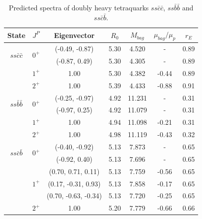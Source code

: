 \documentclass[prd,twocolumn,floatfix,nofootinbib]{revtex4}
\begin{document}
\renewcommand{\tabcolsep}{0.83cm}
\renewcommand{\arraystretch}{1.2}
\begin{table}[!htbp]
    \caption{Predicted spectra of doubly heavy tetraquarks $ss\bar{c}\bar{c}$, $ss\bar{b}\bar{b}$ and $ss\bar{c}\bar{b}$.}
    \label{tab:2heavytetraquark0}
    \begin{tabular}{ccccccc}
        \hline\hline
        {\rm State}     &$J^{P}$    &{\rm Eigenvector}      &$R_{0}$    &$M_{bag}$  &$\mu_{bag}/\mu_{p}$    &$r_{E}$ \\ \hline
        \multirow{2}{*}{$ss\bar{c}\bar{c}$}
                        &\multirow{2}{*}{$0^{+}$}
                                    &(-0.49, -0.87)         &5.30	    &4.520	    &-                      &0.89 \\ 
                        &           &(-0.87, 0.49)          &5.30	    &4.305	    &-                      &0.89 \\ 
                        &$1^{+}$    &1.00                   &5.30	    &4.382	    &-0.44                  &0.89 \\ 
                        &$2^{+}$    &1.00                   &5.39	    &4.433	    &-0.88                  &0.91 \\ 
        \multirow{2}{*}{$ss\bar{b}\bar{b}$}
                        &\multirow{2}{*}{$0^{+}$}
                                    &(-0.25, -0.97)         &4.92	    &11.231	    &-                      &0.31 \\ 
                        &           &(-0.97, 0.25)          &4.92	    &11.079	    &-                      &0.31 \\ 
                        &$1^{+}$    &1.00                   &4.94	    &11.098	    &-0.21                  &0.31 \\ 
                        &$2^{+}$    &1.00                   &4.98	    &11.119	    &-0.43                  &0.32 \\ 
        \multirow{2}{*}{$ss\bar{c}\bar{b}$}
                        &\multirow{2}{*}{$0^{+}$}
                                    &(-0.40, -0.92)         &5.13	    &7.873	    &-                      &0.65 \\ 
                        &           &(-0.92, 0.40)          &5.13	    &7.696	    &-                      &0.65 \\ 
                        &\multirow{3}{*}{$1^{+}$}
                                    &(0.70, 0.71, 0.11)     &5.13	    &7.759	    &-0.56                  &0.65 \\ 
                        &           &(0.17, -0.31, 0.93)    &5.13	    &7.858	    &-0.17                  &0.65 \\ 
                        &           &(0.70, -0.63, -0.34)   &5.13	    &7.720	    &-0.25                  &0.65 \\ 
                        &$2^{+}$    &1.00                   &5.20	    &7.779	    &-0.66                  &0.66 \\ 
        \hline\hline
    \end{tabular}
\end{table}
\end{document}
